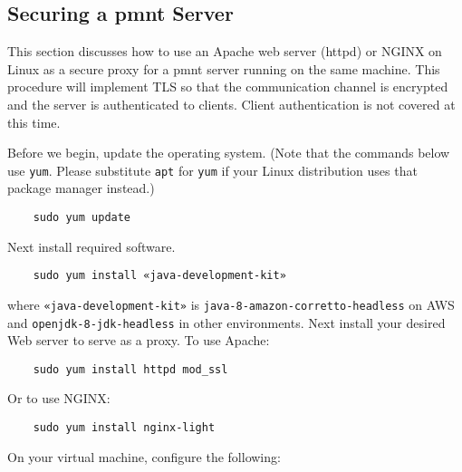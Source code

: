 \subsection{Securing a \ac{pmnt} Server}
\label{section-securing-parliament}

This section discusses how to use an Apache web server (httpd) or NGINX on Linux as a secure proxy for a \ac{pmnt} server running on the same machine.  This procedure will implement TLS so that the communication channel is encrypted and the server is authenticated to clients.  Client authentication is not covered at this time.

Before we begin, update the operating system.  (Note that the commands below use \texttt{yum}.  Please substitute \texttt{apt} for \texttt{yum} if your Linux distribution uses that package manager instead.)

\begin{Verbatim}
	sudo yum update
\end{Verbatim}

Next install required software.

\begin{Verbatim}
	sudo yum install «java-development-kit»
\end{Verbatim}

where \texttt{«java-development-kit»} is \texttt{java-8-amazon-corretto-headless} on AWS and \texttt{openjdk-8-jdk-headless} in other environments.  Next install your desired Web server to serve as a proxy.  To use Apache:

\begin{Verbatim}
	sudo yum install httpd mod_ssl
\end{Verbatim}

Or to use NGINX:

\begin{Verbatim}
	sudo yum install nginx-light
\end{Verbatim}

On your virtual machine, configure the following:

